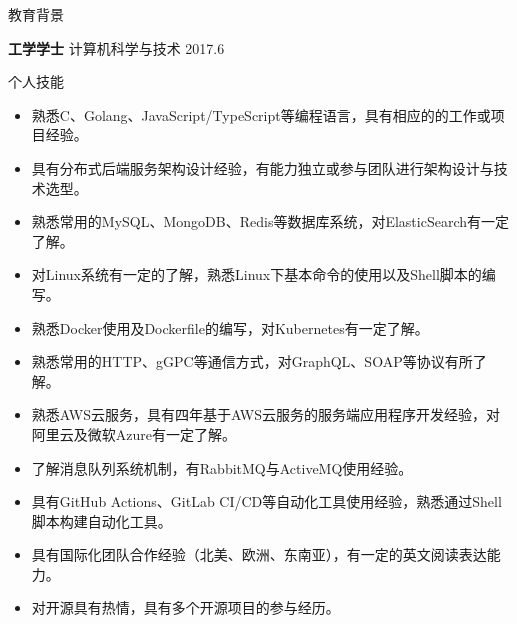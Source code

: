 \documentclass{resume} %
\begin{document}

\begin{rSection}{教育背景}

  {\bf 工学学士} 计算机科学与技术 \hfill {2017.6}

\end{rSection}

\begin{rSection}{个人技能}
  \begin{itemize}
    \itemsep -3pt {}
    \item 熟悉C、Golang、JavaScript/TypeScript等编程语言，具有相应的的工作或项目经验。
    \item 具有分布式后端服务架构设计经验，有能力独立或参与团队进行架构设计与技术选型。
    \item 熟悉常用的MySQL、MongoDB、Redis等数据库系统，对ElasticSearch有一定了解。
    \item 对Linux系统有一定的了解，熟悉Linux下基本命令的使用以及Shell脚本的编写。
    \item 熟悉Docker使用及Dockerfile的编写，对Kubernetes有一定了解。
    \item 熟悉常用的HTTP、gGPC等通信方式，对GraphQL、SOAP等协议有所了解。
    \item 熟悉AWS云服务，具有四年基于AWS云服务的服务端应用程序开发经验，对阿里云及微软Azure有一定了解。
    \item 了解消息队列系统机制，有RabbitMQ与ActiveMQ使用经验。
    \item 具有GitHub Actions、GitLab CI/CD等自动化工具使用经验，熟悉通过Shell脚本构建自动化工具。
    \item 具有国际化团队合作经验（北美、欧洲、东南亚），有一定的英文阅读表达能力。
    \item 对开源具有热情，具有多个开源项目的参与经历。
  \end{itemize}
\end{rSection}
\end{document}
